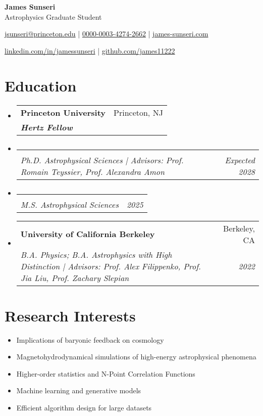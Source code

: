 \documentclass[letterpaper,10pt]{article}
\makeatletter
\newcommand{\resumeItemSimple}[2]{
  \item\small{
    \textbf{#1}{#2 \vspace{-3pt}}
  }
}
\newcommand{\resumeSubheading}[4]{
  \vspace{-1pt}\item[]
  \begin{tabular*}{0.98\textwidth}{l@{\extracolsep{\fill}}r}
      \hspace{-10pt}\textbf{#1} & #2 \\
      \hspace{-10pt}\textit{\small#3} & \textit{\small #4} \\
    \end{tabular*}\vspace{-3pt}
}
\newcommand{\resumeSubHeadingListStart}{\begin{itemize}[leftmargin=*]}
\newcommand{\resumeSubHeadingListEnd}{\end{itemize}}
\newcommand{\resumeItemListStart}{\begin{itemize}}
\newcommand{\shorterSection}[1]{\vspace{-10pt}\section{#1}}
\newcommand{\LinkedinLogo}{\textcolor{rgb:red,6;green,108;blue,170}{\faLinkedinSquare}}
\makeatother
\begin{document}
\begin{center}
  \textbf{\huge James Sunseri} \\ \vspace{0.07in} 
  {\Large Astrophysics Graduate Student} \\ \vspace{0.05in} 
  


  {\normalsize \faSendO \hspace{0pt} \href{href="mailto:jsunseri@princeton.edu"}{jsunseri@princeton.edu} | {\Large {}} \hspace{-2pt} \href{https://orcid.org/0000-0003-4274-2662/}{0000-0003-4274-2662} | \faUser \hspace{0 pt} \href{https://www.james-sunseri.com}{james-sunseri.com} \par \vspace{0.05in} \LinkedinLogo \hspace{0pt} \href{https://www.linkedin.com/in/jamessunseri}{linkedin.com/in/jamessunseri} | \faGithubSquare \hspace{0pt} \href{https://github.com/james11222}{github.com/james11222}}
\end{center}

\shorterSection{Education}
  \resumeSubHeadingListStart
    \resumeSubheading
      {Princeton University}{Princeton, NJ}
      {\textbf{Hertz Fellow}}{}{
    }
    \vspace{-20pt}
    \resumeSubheading
    {}{}{Ph.D. Astrophysical Sciences | Advisors: Prof. Romain Teyssier, Prof. Alexandra Amon}{Expected 2028}{
    }
    \vspace{-20pt}
    \resumeSubheading
    {}{}{M.S. Astrophysical Sciences }{2025}{
    }
    \resumeSubheading
      {University of California Berkeley}{Berkeley, CA}
      {B.A. Physics; B.A. Astrophysics with High Distinction | Advisors: Prof. Alex Filippenko, Prof. Jia Liu, Prof. Zachary Slepian}{2022}{
    }

  \resumeSubHeadingListEnd
  
 
\shorterSection{Research Interests}

\resumeItemListStart
\resumeItemSimple{}{Implications of baryonic feedback on cosmology}
\resumeItemSimple{}{Magnetohydrodynamical simulations of high-energy astrophysical phenomena}
\resumeItemSimple{}{Higher-order statistics and N-Point Correlation Functions}
\resumeItemSimple{}{Machine learning and generative models}
\resumeItemSimple{}{Efficient algorithm design for large datasets}{}
\resumeSubHeadingListEnd
\end{document}
